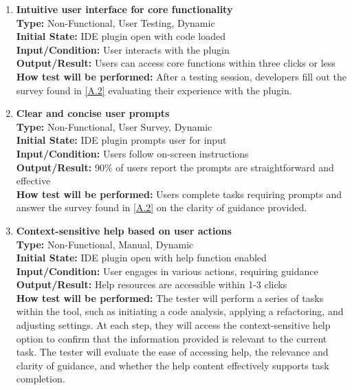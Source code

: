 \documentclass[12pt, titlepage]{article}
\begin{document}
\begin{enumerate}[label={\bf \textcolor{Maroon}{test-UH-\arabic*}}, wide=0pt, font=\itshape]
  \item \textbf{Intuitive user interface for core functionality} \\[2mm]
    \textbf{Type:} Non-Functional, User Testing, Dynamic \\
    \textbf{Initial State:} IDE plugin open with code loaded \\
    \textbf{Input/Condition:} User interacts with the plugin \\
    \textbf{Output/Result:} Users can access core functions within three clicks or less \\[2mm]
    \textbf{How test will be performed:} After a testing session, developers fill out the survey found in \ref{A.2} evaluating their experience with the plugin.

  \item \textbf{Clear and concise user prompts} \\[2mm]
    \textbf{Type:} Non-Functional, User Survey, Dynamic \\
    \textbf{Initial State:} IDE plugin prompts user for input \\
    \textbf{Input/Condition:} Users follow on-screen instructions \\
    \textbf{Output/Result:} 90\% of users report the prompts are straightforward and effective \\[2mm]
    \textbf{How test will be performed:} Users complete tasks requiring prompts and answer the survey found in \ref{A.2} on the clarity of guidance provided.

  \item \textbf{Context-sensitive help based on user actions} \\[2mm]
    \textbf{Type:} Non-Functional, Manual, Dynamic \\
    \textbf{Initial State:} IDE plugin open with help function enabled \\
    \textbf{Input/Condition:} User engages in various actions, requiring guidance \\
    \textbf{Output/Result:} Help resources are accessible within 1-3 clicks \\[2mm]
    \textbf{How test will be performed:} The tester will perform a series of tasks within the tool, such as initiating a code analysis, applying a refactoring, and adjusting settings. At each step, they will access the context-sensitive help option to confirm that the information provided is relevant to the current task. The tester will evaluate the ease of accessing help, the relevance and clarity of guidance, and whether the help content effectively supports task completion.


\end{enumerate}
\end{document}
